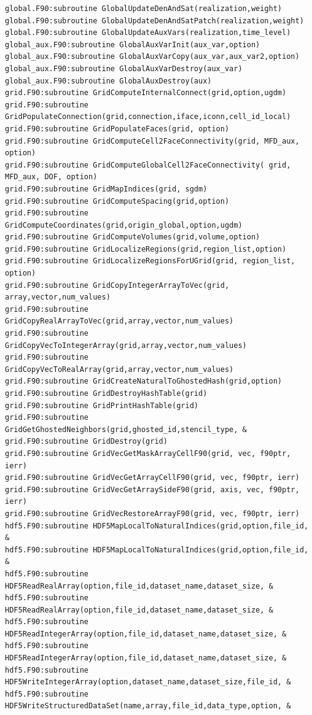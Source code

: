 \documentclass[12pt]{article}
\begin{document}
\begin{verbatim}
global.F90:subroutine GlobalUpdateDenAndSat(realization,weight)
global.F90:subroutine GlobalUpdateDenAndSatPatch(realization,weight)
global.F90:subroutine GlobalUpdateAuxVars(realization,time_level)
global_aux.F90:subroutine GlobalAuxVarInit(aux_var,option)
global_aux.F90:subroutine GlobalAuxVarCopy(aux_var,aux_var2,option)
global_aux.F90:subroutine GlobalAuxVarDestroy(aux_var)
global_aux.F90:subroutine GlobalAuxDestroy(aux)
grid.F90:subroutine GridComputeInternalConnect(grid,option,ugdm)
grid.F90:subroutine GridPopulateConnection(grid,connection,iface,iconn,cell_id_local)
grid.F90:subroutine GridPopulateFaces(grid, option)
grid.F90:subroutine GridComputeCell2FaceConnectivity(grid, MFD_aux, option)
grid.F90:subroutine GridComputeGlobalCell2FaceConnectivity( grid, MFD_aux, DOF, option)
grid.F90:subroutine GridMapIndices(grid, sgdm)
grid.F90:subroutine GridComputeSpacing(grid,option)
grid.F90:subroutine GridComputeCoordinates(grid,origin_global,option,ugdm)
grid.F90:subroutine GridComputeVolumes(grid,volume,option)
grid.F90:subroutine GridLocalizeRegions(grid,region_list,option)
grid.F90:subroutine GridLocalizeRegionsForUGrid(grid, region_list, option)
grid.F90:subroutine GridCopyIntegerArrayToVec(grid, array,vector,num_values)
grid.F90:subroutine GridCopyRealArrayToVec(grid,array,vector,num_values)
grid.F90:subroutine GridCopyVecToIntegerArray(grid,array,vector,num_values)
grid.F90:subroutine GridCopyVecToRealArray(grid,array,vector,num_values)
grid.F90:subroutine GridCreateNaturalToGhostedHash(grid,option)
grid.F90:subroutine GridDestroyHashTable(grid)
grid.F90:subroutine GridPrintHashTable(grid)
grid.F90:subroutine GridGetGhostedNeighbors(grid,ghosted_id,stencil_type, &
grid.F90:subroutine GridDestroy(grid)
grid.F90:subroutine GridVecGetMaskArrayCellF90(grid, vec, f90ptr, ierr)
grid.F90:subroutine GridVecGetArrayCellF90(grid, vec, f90ptr, ierr)
grid.F90:subroutine GridVecGetArraySideF90(grid, axis, vec, f90ptr, ierr)
grid.F90:subroutine GridVecRestoreArrayF90(grid, vec, f90ptr, ierr)
hdf5.F90:subroutine HDF5MapLocalToNaturalIndices(grid,option,file_id, &
hdf5.F90:subroutine HDF5MapLocalToNaturalIndices(grid,option,file_id, &
hdf5.F90:subroutine HDF5ReadRealArray(option,file_id,dataset_name,dataset_size, &
hdf5.F90:subroutine HDF5ReadRealArray(option,file_id,dataset_name,dataset_size, &
hdf5.F90:subroutine HDF5ReadIntegerArray(option,file_id,dataset_name,dataset_size, &
hdf5.F90:subroutine HDF5ReadIntegerArray(option,file_id,dataset_name,dataset_size, &
hdf5.F90:subroutine HDF5WriteIntegerArray(option,dataset_name,dataset_size,file_id, &
hdf5.F90:subroutine HDF5WriteStructuredDataSet(name,array,file_id,data_type,option, &

\end{verbatim}
\end{document}
